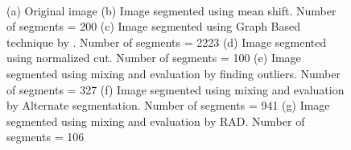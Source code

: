 \documentclass[twoside,11pt]{article}
\begin{document}
\begin{figure}[!t]
{    \label{fig:nc}
}\\
\caption{(a) Original image (b) Image segmented using mean shift. Number of
segments = 200 (c) Image segmented using Graph Based technique by
\cite{Felzenszwalb04efficientgraph-based}. Number of segments = 2223 (d) Image
segmented using normalized cut. Number of segments = 100 (e) Image segmented
using mixing and evaluation by finding outliers. Number of segments = 327
(f) Image segmented using mixing and evaluation by Alternate segmentation.
Number of segments = 941 (g) Image segmented using mixing and evaluation
by RAD. Number of segments = 106}
\label{fig:mix_allsegs}
\end{figure}
\end{document}
